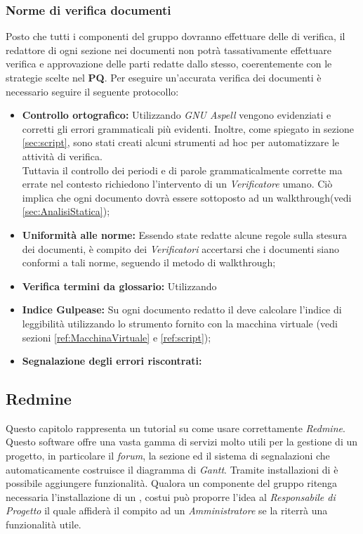\documentclass{scalatekids-article}
\begin{document}
\subsubsection{Norme di verifica documenti}
Posto che tutti i componenti del gruppo dovranno effettuare delle  di
verifica, il redattore di ogni sezione nei documenti non potrà tassativamente
effettuare verifica e approvazione delle parti redatte dallo stesso,
coerentemente con le strategie scelte nel \textbf{PQ}.
Per eseguire un'accurata verifica dei documenti è necessario seguire il seguente
protocollo:
\begin{itemize}
\item\textbf{Controllo ortografico:} Utilizzando \textit{GNU Aspell} vengono evidenziati e corretti
  gli errori grammaticali più evidenti. Inoltre, come spiegato in sezione \ref{sec:script}, sono stati
  creati alcuni strumenti ad hoc per automatizzare le attività di verifica.\\
  Tuttavia il controllo dei periodi e di parole grammaticalmente corrette ma errate nel contesto richiedono
  l'intervento di un \textit{Verificatore} umano. Ciò implica che ogni documento dovrà essere sottoposto ad un walkthrough(vedi \ref{sec:AnalisiStatica});
\item\textbf{Uniformità alle norme:} Essendo state redatte alcune regole sulla stesura dei documenti, è compito dei \textit{Verificatori}
  accertarsi che i documenti siano conformi a tali norme, seguendo il metodo di walkthrough;
\item\textbf{Verifica termini da glossario:} Utilizzando
\item\textbf{Indice Gulpease:} Su ogni documento redatto il  deve calcolare l'indice di leggibilità utilizzando lo strumento fornito
  con la macchina virtuale (vedi sezioni \ref{ref:MacchinaVirtuale} e \ref{ref:script});
\item\textbf{Segnalazione degli errori riscontrati:}
\end{itemize}

\subsection{Redmine}
Questo capitolo rappresenta un tutorial su come usare correttamente \textit{Redmine}.
Questo software offre una vasta gamma di servizi molto utili per la gestione di un progetto, in particolare il \textit{forum}, la sezione  ed il sistema di segnalazioni che automaticamente costruisce il diagramma di \textit{Gantt}. Tramite installazioni di  è possibile aggiungere funzionalità. Qualora un componente del gruppo ritenga necessaria l'installazione di un , costui può proporre l'idea al \textit{Responsabile di Progetto} il quale affiderà il compito ad un \textit{Amministratore} se la riterrà una funzionalità utile.
\end{document}

